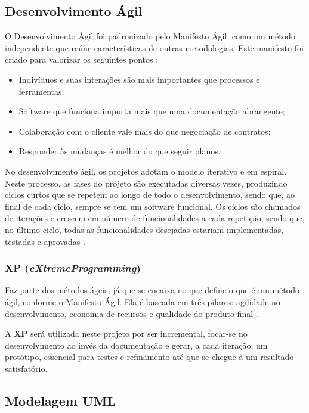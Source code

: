 \subsection{Desenvolvimento Ágil}\label{subsec:devagil}
O Desenvolvimento Ágil foi padronizado pelo Manifesto Ágil, como um método independente que reúne características de outras metodologias. Este manifesto foi criado para valorizar os seguintes pontos \cite{dev-agil}:

\begin{itemize}
	\item Indivíduos e suas interações são mais importantes que processos e ferramentas;
	\item Software que funciona importa mais que uma documentação abrangente;
	\item Colaboração com o cliente vale mais do que negociação de contratos;
	\item Responder às mudanças é melhor do que seguir planos.
\end{itemize}

No desenvolvimento ágil, os projetos adotam o modelo iterativo e em espiral. Neste processo, as fases do projeto são executadas diversas vezes, produzindo ciclos curtos que se repetem ao longo de todo o desenvolvimento, sendo que, ao final de cada ciclo, sempre se tem um software funcional. Os ciclos são chamados de iterações e crescem em número de funcionalidades a cada repetição, sendo que, no último ciclo, todas as funcionalidades desejadas estariam implementadas, testadas e aprovadas \cite{dev-agil2}.

\subsubsection{XP (\textit{eXtremeProgramming})}

Faz parte dos métodos ágeis, já que se encaixa no que define o que é um método ágil, conforme o Manifesto Ágil. Ela é baseada em três pilares: agilidade no desenvolvimento, economia de recursos e qualidade do produto final \cite{dev-agil2}.

A \textbf{XP} será utilizada neste projeto por ser incremental, focar-se no desenvolvimento ao invés da documentação e gerar, a cada iteração, um protótipo, essencial para testes e refinamento até que se chegue à um resultado satisfatório.



\subsection{Modelagem UML}\label{subsec:uml}

